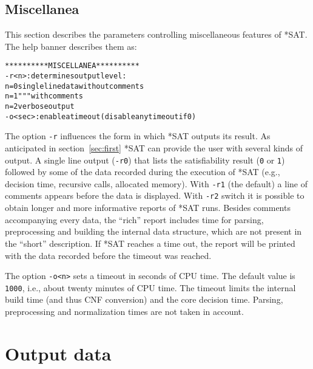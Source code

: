 \documentclass[12pt]{report}
\begin{document}
\subsection{Miscellanea}
\label{sub:misc}

This section describes the parameters controlling miscellaneous
features of *SAT. The help banner describes them as:
\begin{alltt}
\footnotesize
********** MISCELLANEA **********
   -r<n>    : determines output level:
               n=0 single line data without comments
               n=1    "     "  "   with comments
               n=2 verbose output
   -o<sec>  : enable a timeout (disable any timeout if 0)  
\end{alltt}
The option {\tt -r} influences the form in which *SAT outputs its
result. As anticipated in section~\ref{sec:first} *SAT can provide the
user with several kinds of output. A single line output ({\tt -r0}) that
lists the satisfiability result ({\tt 0} or {\tt 1}) followed by some
of the data recorded during the execution of *SAT (e.g., decision
time, recursive calls, allocated memory). With {\tt -r1} (the default)
a line of comments appears before the data is displayed.
With {\tt -r2} switch it is
possible to obtain longer and more informative reports of *SAT
runs. Besides comments accompanying every data, the ``rich'' report
includes time for parsing, preprocessing and building the internal
data structure, which are not present in the ``short''
description. If *SAT reaches a time out,
the report will be printed with the data recorded before the timeout
was reached.

The option {\tt -o<n>} sets a timeout in seconds of CPU time. The
default value is {\tt 1000}, i.e., about twenty minutes of CPU
time. The timeout limits the internal build time (and thus CNF conversion)
and the core decision time. Parsing, preprocessing and normalization
times are not taken in account.  

\section{Output data}
\label{sec:output}
\end{document}
